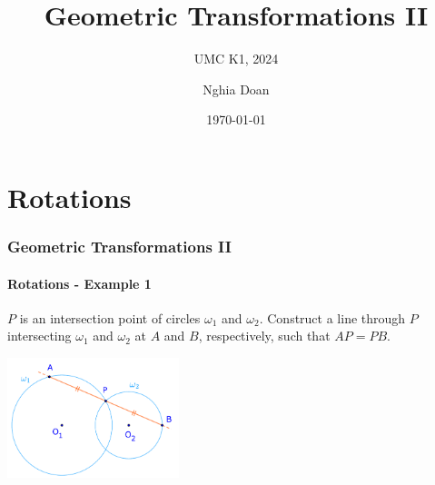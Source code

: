\documentclass[8pt,xcolor=table,dvipsnames]{beamer}
\title{Geometric Transformations II}
\subtitle{UMC K1, 2024}
\author{Nghia Doan}
\institute{MCC Club \& Competitions}
\date{\today}
\begin{document}
\section{Rotations}

\begin{frame}[t]
    \frametitle{Geometric Transformations II}
    \framesubtitle{Rotations - Example 1}
    \begin{example}
        $P$ is an intersection point of circles $\omega_1$ and $\omega_2$.
        Construct a line through $P$ intersecting $\omega_1$ and $\omega_2$ at $A$ and $B$, respectively,
        such that $AP = PB.$
    \end{example}

    \begin{center}
        \includegraphics[width=5cm]{./svg/pdf/rotation-1a.pdf}
    \end{center}
\end{frame}
\end{document}
